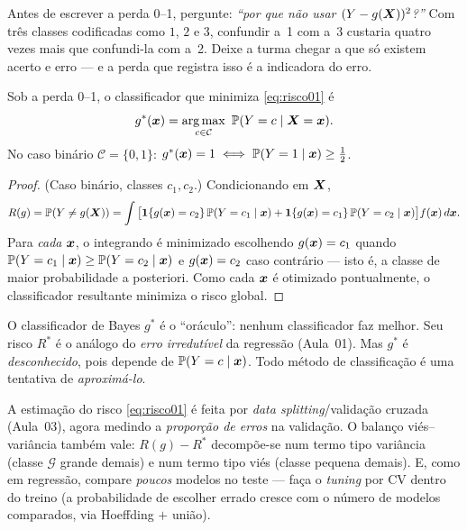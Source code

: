 \documentclass[11pt,a4paper]{article}
\begin{document}
\begin{emsala}
Antes de escrever a perda 0--1, pergunte: \emph{``por que não usar
$(Y-g(\bm{X}))^2$?''} Com três classes codificadas como $1$, $2$ e $3$, confundir a~1
com a~3 custaria quatro vezes mais que confundi-la com a~2. Deixe a turma chegar a
que só existem acerto e erro --- e a perda que registra isso é a indicadora do erro.
\end{emsala}

\begin{teorema}\label{teo:bayes}
Sob a perda 0--1, o classificador que minimiza \eqref{eq:risco01} é
\[
  g^*(\x) = \argmax_{c\in\mathcal{C}}\ \Prob(Y=c\mid \X=\x).
\]
No caso binário $\mathcal{C}=\{0,1\}$: $g^*(\bm{x})=1 \iff \mathbb{P}(Y=1\mid\bm{x})\ge \tfrac12$.
\end{teorema}
\begin{proof}
(Caso binário, classes $c_1,c_2$.) Condicionando em $\bm{X}$,
\[
  R(g)=\mathbb{P}(Y\ne g(\bm{X}))
  =\int \big[\mathbf{1}\!\left\{g(\bm{x})=c_2\right\}\mathbb{P}(Y=c_1\mid\bm{x})+\mathbf{1}\!\left\{g(\bm{x})=c_1\right\}\mathbb{P}(Y=c_2\mid\bm{x})\big]f(\bm{x})\,d\bm{x}.
\]
Para \emph{cada} $\bm{x}$, o integrando é minimizado escolhendo $g(\bm{x})=c_1$ quando
$\mathbb{P}(Y=c_1\mid\bm{x})\ge\mathbb{P}(Y=c_2\mid\bm{x})$ e $g(\bm{x})=c_2$ caso contrário --- isto é,
a classe de maior probabilidade a posteriori. Como cada $\bm{x}$ é otimizado
pontualmente, o classificador resultante minimiza o risco global.
\end{proof}

\begin{ideia}
O classificador de Bayes $g^*$ é o ``oráculo'': nenhum classificador faz melhor. Seu
risco $R^*$ é o análogo do \emph{erro irredutível} da regressão (Aula~01). Mas
$g^*$ é \emph{desconhecido}, pois depende de $\mathbb{P}(Y=c\mid\bm{x})$. Todo método de
classificação é uma tentativa de \emph{aproximá-lo}.
\end{ideia}

\begin{observacao}
A estimação do risco \eqref{eq:risco01} é feita por \emph{data splitting}/validação
cruzada (Aula~03), agora medindo a \emph{proporção de erros} na validação. O balanço
viés--variância também vale: $R(g)-R^*$ decompõe-se num termo tipo variância (classe
$\mathcal{G}$ grande demais) e num termo tipo viés (classe pequena demais). E, como
em regressão, compare \emph{poucos} modelos no teste --- faça o \emph{tuning} por CV
dentro do treino (a probabilidade de escolher errado cresce com o número de modelos
comparados, via Hoeffding $+$ união).
\end{observacao}
\end{document}
